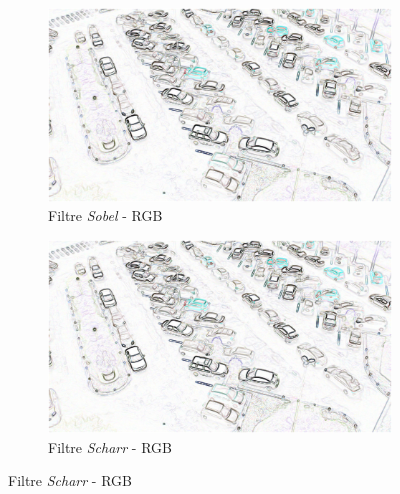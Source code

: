 \begin{figure}[H]
    \begin{subfigure}{.5\textwidth}
        \centering
        \includegraphics[width=.85\linewidth]{img/conception/image_process/downsample-edge/0.png}
        \caption{Filtre \textit{Sobel} - RGB}
    \end{subfigure}%
    \begin{subfigure}{.5\textwidth}
        \centering
        \includegraphics[width=.85\linewidth]{img/conception/image_process/downsample-edge/3.png}
        \caption{Filtre \textit{Scharr} - RGB}
    \end{subfigure}%


\end{figure}
